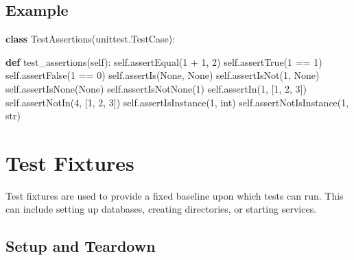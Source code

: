 \documentclass[
  letterpaper,
  DIV=11,
  numbers=noendperiod]{scrreprt}
\newenvironment{Shaded}{\begin{snugshade}}{\end{snugshade}}
\newcommand{\BuiltInTok}[1]{\textcolor[rgb]{0.00,0.23,0.31}{#1}}
\newcommand{\DecValTok}[1]{\textcolor[rgb]{0.68,0.00,0.00}{#1}}
\newcommand{\KeywordTok}[1]{\textcolor[rgb]{0.00,0.23,0.31}{\textbf{#1}}}
\newcommand{\NormalTok}[1]{\textcolor[rgb]{0.00,0.23,0.31}{#1}}
\newcommand{\OperatorTok}[1]{\textcolor[rgb]{0.37,0.37,0.37}{#1}}
\newcommand{\VariableTok}[1]{\textcolor[rgb]{0.07,0.07,0.07}{#1}}
\begin{document}
\subsection{Example}\label{example-11}

\begin{Shaded}
\begin{Highlighting}[]
\KeywordTok{class}\NormalTok{ TestAssertions(unittest.TestCase):}

    \KeywordTok{def}\NormalTok{ test\_assertions(}\VariableTok{self}\NormalTok{):}
        \VariableTok{self}\NormalTok{.assertEqual(}\DecValTok{1} \OperatorTok{+} \DecValTok{1}\NormalTok{, }\DecValTok{2}\NormalTok{)}
        \VariableTok{self}\NormalTok{.assertTrue(}\DecValTok{1} \OperatorTok{==} \DecValTok{1}\NormalTok{)}
        \VariableTok{self}\NormalTok{.assertFalse(}\DecValTok{1} \OperatorTok{==} \DecValTok{0}\NormalTok{)}
        \VariableTok{self}\NormalTok{.assertIs(}\VariableTok{None}\NormalTok{, }\VariableTok{None}\NormalTok{)}
        \VariableTok{self}\NormalTok{.assertIsNot(}\DecValTok{1}\NormalTok{, }\VariableTok{None}\NormalTok{)}
        \VariableTok{self}\NormalTok{.assertIsNone(}\VariableTok{None}\NormalTok{)}
        \VariableTok{self}\NormalTok{.assertIsNotNone(}\DecValTok{1}\NormalTok{)}
        \VariableTok{self}\NormalTok{.assertIn(}\DecValTok{1}\NormalTok{, [}\DecValTok{1}\NormalTok{, }\DecValTok{2}\NormalTok{, }\DecValTok{3}\NormalTok{])}
        \VariableTok{self}\NormalTok{.assertNotIn(}\DecValTok{4}\NormalTok{, [}\DecValTok{1}\NormalTok{, }\DecValTok{2}\NormalTok{, }\DecValTok{3}\NormalTok{])}
        \VariableTok{self}\NormalTok{.assertIsInstance(}\DecValTok{1}\NormalTok{, }\BuiltInTok{int}\NormalTok{)}
        \VariableTok{self}\NormalTok{.assertNotIsInstance(}\DecValTok{1}\NormalTok{, }\BuiltInTok{str}\NormalTok{)}
\end{Highlighting}
\end{Shaded}

\section{Test Fixtures}\label{test-fixtures}

Test fixtures are used to provide a fixed baseline upon which tests can
run. This can include setting up databases, creating directories, or
starting services.

\subsection{Setup and Teardown}\label{setup-and-teardown}
\end{document}
